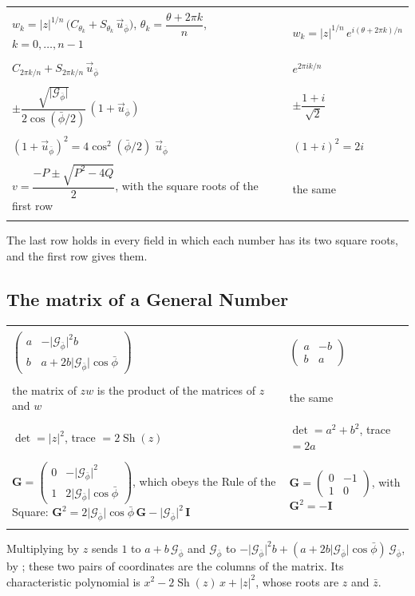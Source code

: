 \documentclass[11pt,a4paper]{amsart}
\makeatletter
\theoremstyle{plain}
\theoremstyle{definition}
\theoremstyle{remark}
\newcommand{\pb}{\bar{\phi}}                     %
\newcommand{\Gp}{\mathcal{G}_{\bar{\phi}}}       %
\newcommand{\up}{\vec{u}_{\bar{\phi}}}           %
\DeclareMathOperator{\Sh}{Sh}                    %
\newcommand{\gnlaw}[3]{\multicolumn{2}{@{}l@{}}{\small\itshape #1}\\* #2 & #3 \\ \addlinespace[4pt]}
\newenvironment{gnlaws}{%
  \begin{longtable}{@{}>{\small\raggedright\arraybackslash}p{0.62\textwidth}@{\hspace{0.04\textwidth}}>{\small\raggedright\arraybackslash}p{0.32\textwidth}@{}}
  \toprule
  \multicolumn{1}{@{}l}{\textsc{in a relative plane}} & \multicolumn{1}{l@{}}{\textsc{the complex case}} \\
  \midrule
  \endhead
  \bottomrule
  \endlastfoot}
  {\end{longtable}}
\makeatother
\begin{document}
\begin{gnlaws}
\gnlaw{the $n$-th roots of $z$ (\Cref{thm:roots})}
  {$w_k = \lvert z\rvert^{1/n}\,\bigl(C_{\theta_k} + S_{\theta_k}\,\up\bigr)$, \quad $\theta_k = \dfrac{\theta + 2\pi k}{n}$, \quad $k = 0, \dots, n - 1$}
  {$w_k = \lvert z\rvert^{1/n}\,e^{i(\theta + 2\pi k)/n}$}
\gnlaw{the roots of unity (\Cref{thm:roots})}
  {$C_{2\pi k/n} + S_{2\pi k/n}\,\up$}
  {$e^{2\pi ik/n}$}
\gnlaw{the square roots of the Composer Unit (\Cref{cor:sqrt})}
  {$\pm\dfrac{\sqrt{\lvert\Gp\rvert}}{2\cos(\pb/2)}\,(1 + \up)$}
  {$\pm\dfrac{1 + i}{\sqrt{2}}$}
\gnlaw{one step along each axis, squared (\Cref{cor:sqrt})}
  {$(1 + \up)^2 = 4\cos^2(\pb/2)\;\up$}
  {$(1 + i)^2 = 2i$}
\gnlaw{the quadratic equation $v^2 + Pv + Q = 0$}
  {$v = \dfrac{-P \pm \sqrt{P^2 - 4Q}}{2}$, with the square roots of the first row}
  {the same}
\end{gnlaws}
The last row holds in every field in which each number has its two square roots, and the first row gives them.

\subsection{The matrix of a General Number}\label{app:matrix}

\begin{gnlaws}
\gnlaw{the matrix of $z$}
  {$\begin{pmatrix} a & -\lvert\Gp\rvert^2 b \\ b & a + 2b\lvert\Gp\rvert\cos\pb \end{pmatrix}$}
  {$\begin{pmatrix} a & -b \\ b & a \end{pmatrix}$}
\gnlaw{products}
  {the matrix of $zw$ is the product of the matrices of $z$ and $w$}
  {the same}
\gnlaw{determinant and trace}
  {$\det = \lvert z\rvert^2$, \quad trace $= 2\Sh(z)$}
  {$\det = a^2 + b^2$, \quad trace $= 2a$}
\gnlaw{the matrix of the Composer Unit}
  {$\mathbf{G} = \begin{pmatrix} 0 & -\lvert\Gp\rvert^2 \\ 1 & 2\lvert\Gp\rvert\cos\pb \end{pmatrix}$, which obeys the Rule of the Square: $\mathbf{G}^2 = 2\lvert\Gp\rvert\cos\pb\,\mathbf{G} - \lvert\Gp\rvert^2\,\mathbf{I}$}
  {$\mathbf{G} = \begin{pmatrix} 0 & -1 \\ 1 & 0 \end{pmatrix}$, with $\mathbf{G}^2 = -\mathbf{I}$}
\end{gnlaws}
Multiplying by $z$ sends $1$ to $a + b\,\Gp$ and $\Gp$ to $-\lvert\Gp\rvert^2 b + (a + 2b\lvert\Gp\rvert\cos\pb)\,\Gp$, by ; these two pairs of coordinates are the columns of the matrix. Its characteristic polynomial is $x^2 - 2\Sh(z)\,x + \lvert z\rvert^2$, whose roots are $z$ and $\bar{z}$.
\end{document}
